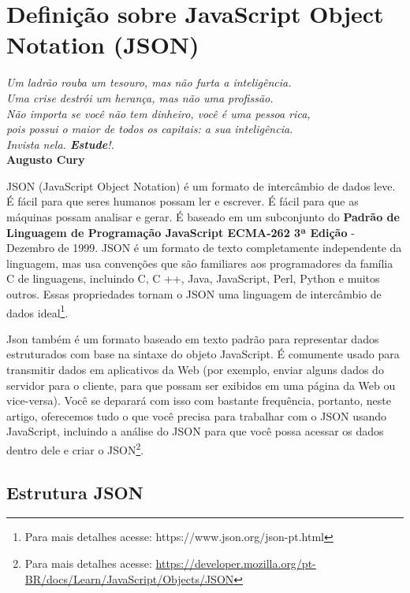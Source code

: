 \chapter{Definição sobre JavaScript Object Notation (JSON)}\label{cap:cap3}

\begin{flushright}
	\textit{
		Um ladrão rouba um tesouro, mas não furta a inteligência. \\
		Uma crise destrói um herança, mas não uma profissão. \\ Não importa se você não tem dinheiro, você é uma pessoa rica, \\ pois possui o maior de todos os capitais: a sua inteligência. \\ Invista nela. \textbf{Estude}!.
	} \\
	
	\textbf{Augusto Cury}
\end{flushright}

JSON (JavaScript Object Notation) é um formato de intercâmbio de dados leve. É fácil para que seres humanos possam ler e escrever. É fácil para que as máquinas possam analisar e gerar. É baseado em um subconjunto do \textbf{Padrão de Linguagem de Programação JavaScript ECMA-262 3ª Edição} - Dezembro de 1999. JSON é um formato de texto completamente independente da linguagem, mas usa convenções que são familiares aos programadores da família C de linguagens, incluindo C, C ++, Java, JavaScript, Perl, Python e muitos outros. Essas propriedades tornam o JSON uma linguagem de intercâmbio de dados ideal\footnote{Para mais detalhes acesse: https://www.json.org/json-pt.html}.

Json também é um formato baseado em texto padrão para representar dados estruturados com base na sintaxe do objeto JavaScript. É comumente usado para transmitir dados em aplicativos da Web (por exemplo, enviar alguns dados do servidor para o cliente, para que possam ser exibidos em uma página da Web ou vice-versa). Você se deparará com isso com bastante frequência, portanto, neste artigo, oferecemos tudo o que você precisa para trabalhar com o JSON usando JavaScript, incluindo a análise do JSON para que você possa acessar os dados dentro dele e criar o JSON\footnote{Para mais detalhes acesse: \url{https://developer.mozilla.org/pt-BR/docs/Learn/JavaScript/Objects/JSON}}.

\section{Estrutura JSON}


